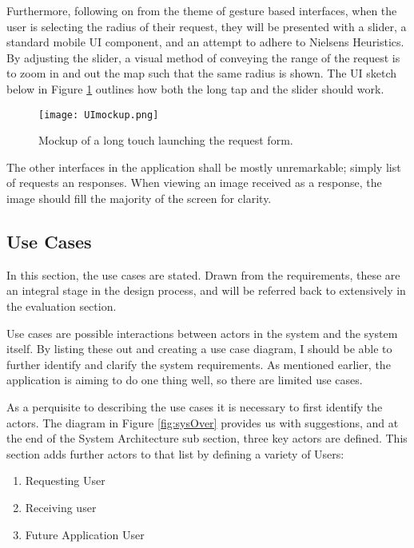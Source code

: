 \documentclass[a4paper]{article}
\begin{document}
Furthermore, following on from the theme of gesture based interfaces, when the user is selecting the radius of their request, they will be presented with a slider, a standard mobile UI component, and an attempt to adhere to Nielsens Heuristics. By adjusting the slider, a visual method of conveying the range of the request is to zoom in and out the map such that the same radius is shown. The UI sketch below in Figure \ref{fig:uimck} outlines how both the long tap and the slider should work.

\begin{figure}[H]
  \centering
    \texttt{[image: UImockup.png]} 
     \caption{Mockup of a long touch launching the request form.}
     \label{fig:uimck}
\end{figure}

The other interfaces in the application shall be mostly unremarkable; simply list of requests an responses. When viewing an image received as a response, the image should fill the majority of the screen for clarity.



\newpage
\subsection{Use Cases}
In this section, the use cases are stated. Drawn from the requirements, these are an integral stage in the design process, and will be referred back to extensively in the evaluation section.

Use cases are possible interactions between actors in the system and the system itself. By listing these out and creating a use case diagram, I should be able to further identify and clarify the system requirements. As mentioned earlier, the application is aiming to do one thing well, so there are limited use cases.

As a perquisite to describing the use cases it is necessary to first identify the actors. The diagram in Figure \ref{fig:sysOver} provides us with suggestions, and at the end of the System Architecture sub section, three key actors are defined. This section adds further actors to that list by defining a variety of Users:
\begin{enumerate}
  
  \item Requesting User
  \item Receiving user
  \item Future Application User
  
\end{enumerate}
\end{document}
